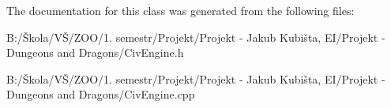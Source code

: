 The documentation for this class was generated from the following files\-:\begin{DoxyCompactItemize}
\item 
B\-:/Škola/\-VŠ/\-Z\-O\-O/1. semestr/\-Projekt/\-Projekt -\/ Jakub Kubišta, E\-I/\-Projekt -\/ Dungeons and Dragons/Civ\-Engine.\-h\item 
B\-:/Škola/\-VŠ/\-Z\-O\-O/1. semestr/\-Projekt/\-Projekt -\/ Jakub Kubišta, E\-I/\-Projekt -\/ Dungeons and Dragons/Civ\-Engine.\-cpp\end{DoxyCompactItemize}
